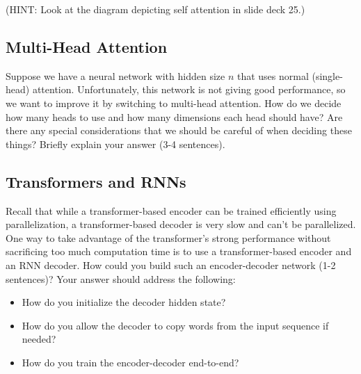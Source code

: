 \documentclass[12pt,a4paper]{article}
\begin{document}
\vspace{.5\baselineskip}

(HINT: Look at the diagram depicting self attention in slide deck 25.)

\subsection{Multi-Head Attention}

Suppose we have a neural network with hidden size $n$ that uses normal (single-head) attention. Unfortunately, this network is not giving good performance, so we want to improve it by switching to multi-head attention. How do we decide how many heads to use and how many dimensions each head should have? Are there any special considerations that we should be careful of when deciding these things? Briefly explain your answer (3-4 sentences).

\subsection{Transformers and RNNs}

Recall that while a transformer-based encoder can be trained efficiently using parallelization, a transformer-based decoder is very slow and can't be parallelized. One way to take advantage of the transformer's strong performance without sacrificing too much computation time is to use a transformer-based encoder and an RNN decoder. How could you build such an encoder-decoder network (1-2 sentences)? Your answer should address the following:

\begin{itemize}
\item How do you initialize the decoder hidden state?
\item How do you allow the decoder to copy words from the input sequence if needed?
\item How do you train the encoder-decoder end-to-end?
\end{itemize}
\end{document}
